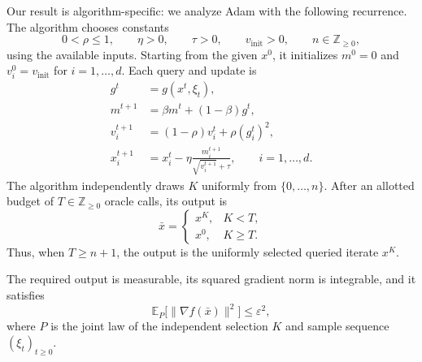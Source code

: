 \documentclass[10pt]{article}
\theoremstyle{definition}
\begin{document}
Our result is algorithm-specific: we analyze Adam with the following recurrence. The algorithm chooses constants
\[
0<\rho\leq1,\qquad \eta>0,\qquad \tau>0,\qquad v_{\mathrm{init}}>0,
\qquad n\in\mathbb{Z}_{\geq0},
\]
using the available inputs. Starting from the given $x^0$, it initializes $m^0=0$ and $v_i^0=v_{\mathrm{init}}$ for $i=1,\ldots,d$. Each query and update is
\[
\begin{aligned}
g^t&=g(x^t,\xi_t),\\
m^{t+1}&=\beta m^t+(1-\beta)g^t,\\
v_i^{t+1}&=(1-\rho)v_i^t+\rho(g_i^t)^2,\\
x_i^{t+1}&=x_i^t-\eta\frac{m_i^{t+1}}{\sqrt{v_i^{t+1}}+\tau},
\qquad i=1,\ldots,d.
\end{aligned}
\]
The algorithm independently draws $K$ uniformly from $\{0,\ldots,n\}$. After an allotted budget of $T\in\mathbb{Z}_{\geq0}$ oracle calls, its output is
\[
\bar{x}=\begin{cases}
x^K,&K<T,\\
x^0,&K\geq T.
\end{cases}
\]
Thus, when $T\geq n+1$, the output is the uniformly selected queried iterate $x^K$.

The required output is measurable, its squared gradient norm is integrable, and it satisfies
\[
\mathbb{E}_{P}\bigl[\|\nabla f(\bar{x})\|^2\bigr]\leq\varepsilon^2,
\]
where $P$ is the joint law of the independent selection $K$ and sample sequence $(\xi_t)_{t\geq0}$.
\end{document}
